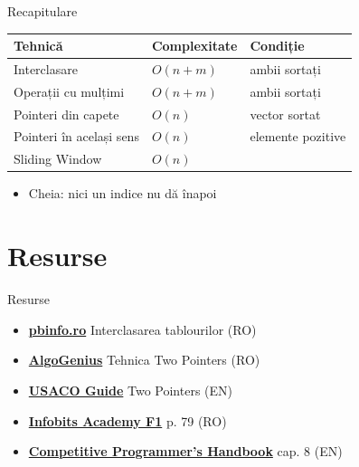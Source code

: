 ﻿\documentclass{beamer}
\begin{document}
\begin{frame}{Recapitulare}
  \begin{center}
  \begin{tabular}{lll}
    \toprule
    Tehnică & Complexitate & Condiție \\
    \midrule
    Interclasare           & $O(n+m)$ & ambii sortați \\
    Operații cu mulțimi    & $O(n+m)$ & ambii sortați \\
    Pointeri din capete      & $O(n)$   & vector sortat \\
    Pointeri în același sens & $O(n)$   & elemente pozitive \\
    Sliding Window     & $O(n)$   & \textemdash{} \\
    \bottomrule
  \end{tabular}
  \end{center}

  \begin{itemize}
    \item Cheia: nici un indice nu dă înapoi
  \end{itemize}
\end{frame}

\section{Resurse}

\begin{frame}{Resurse}
  \begin{itemize}\itemsep6pt
    \item \href{https://www.pbinfo.ro/articole/5588/interclasarea-tablourilor}{\textbf{pbinfo.ro}} \textemdash{} Interclasarea tablourilor (RO)
    \item \href{https://old.algogenius.ro/two-pointers/}{\textbf{AlgoGenius}} \textemdash{} Tehnica Two Pointers (RO)
    \item \href{https://usaco.guide/silver/two-pointers?lang=cpp}{\textbf{USACO Guide}} \textemdash{} Two Pointers (EN)
    \item \href{https://cdn.sepi.ro/infobits-f1.pdf}{\textbf{Infobits Academy F1}} \textemdash{} p. 79 (RO)
    \item \href{https://cses.fi/book/book.pdf}{\textbf{Competitive Programmer's Handbook}} \textemdash{} cap. 8 (EN)
  \end{itemize}
\end{frame}
\end{document}
